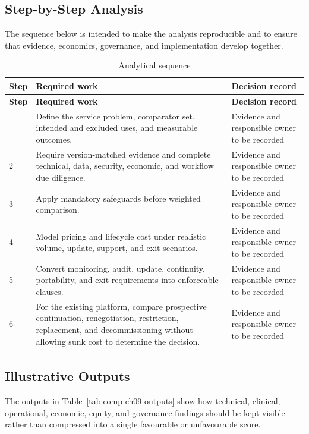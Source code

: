 \subsection{Step-by-Step Analysis}
The sequence below is intended to make the analysis reproducible and to ensure
that evidence, economics, governance, and implementation develop together.

\begin{longtable}{@{}p{}p{}p{}@{}}
\caption{Analytical sequence}
\label{tab:comp-ch09-analysis-steps}\\
\toprule
\textbf{Step} & \textbf{Required work} & \textbf{Decision record} \\
\midrule
\endfirsthead
\toprule
\textbf{Step} & \textbf{Required work} & \textbf{Decision record} \\
\midrule
\endhead
\bottomrule
\endlastfoot
1 & Define the service problem, comparator set, intended and excluded uses, and measurable outcomes. & Evidence and responsible owner to be recorded \\
2 & Require version-matched evidence and complete technical, data, security, economic, and workflow due diligence. & Evidence and responsible owner to be recorded \\
3 & Apply mandatory safeguards before weighted comparison. & Evidence and responsible owner to be recorded \\
4 & Model pricing and lifecycle cost under realistic volume, update, support, and exit scenarios. & Evidence and responsible owner to be recorded \\
5 & Convert monitoring, audit, update, continuity, portability, and exit requirements into enforceable clauses. & Evidence and responsible owner to be recorded \\
6 & For the existing platform, compare prospective continuation, renegotiation, restriction, replacement, and decommissioning without allowing sunk cost to determine the decision. & Evidence and responsible owner to be recorded \\
\end{longtable}

\subsection{Illustrative Outputs}
The outputs in Table~\ref{tab:comp-ch09-outputs} show how technical,
clinical, operational, economic, equity, and governance findings should be kept
visible rather than compressed into a single favourable or unfavourable score.

